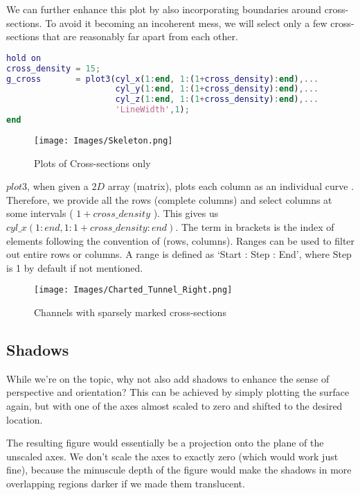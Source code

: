 \documentclass[a4paper]{article}
\begin{document}
We can further enhance this plot by also incorporating boundaries around cross-sections. To avoid it becoming an incoherent mess, we will select only a few cross-sections that are reasonably far apart from each other.

\begin{lstlisting}[language=matlab]
hold on
cross_density = 15;
g_cross       = plot3(cyl_x(1:end, 1:(1+cross_density):end),...
                      cyl_y(1:end, 1:(1+cross_density):end),...
                      cyl_z(1:end, 1:(1+cross_density):end),...
                      'LineWidth',1);
end
\end{lstlisting}

\begin{figure}[h]
    \centering
    \texttt{[image: Images/Skeleton.png]}
    \caption{Plots of Cross-sections only}
    \label{fig:enter-label}
\end{figure}

\(plot3\), when given a \(2D\) array (matrix), plots each column as an individual curve \cite{mathworks_plot3}. Therefore, we provide all the rows (complete columns) and select columns at some intervals ( \(1+cross\_density\) ). This gives us \(cyl\_x( 1 : end , 1 : 1+cross\_density : end)\). The term in brackets is the index of elements following the convention of (rows, columns). Ranges can be used to filter out entire rows or columns. A range is defined as ‘Start : Step : End', where Step is 1 by default if not mentioned.
\begin{figure}[h!]
    \centering
    \texttt{[image: Images/Charted\_Tunnel\_Right.png]}
    \caption{Channels with sparsely marked cross-sections}
\end{figure}

\subsection{Shadows}
While we’re on the topic, why not also add shadows to enhance the sense of perspective and orientation? This can be achieved by simply plotting the surface again, but with one of the axes almost scaled to zero and shifted to the desired location.

The resulting figure would essentially be a projection onto the plane of the unscaled axes. We don’t scale the axes to exactly zero (which would work just fine), because the minuscule depth of the figure would make the shadows in more overlapping regions darker if we made them translucent.
\end{document}
